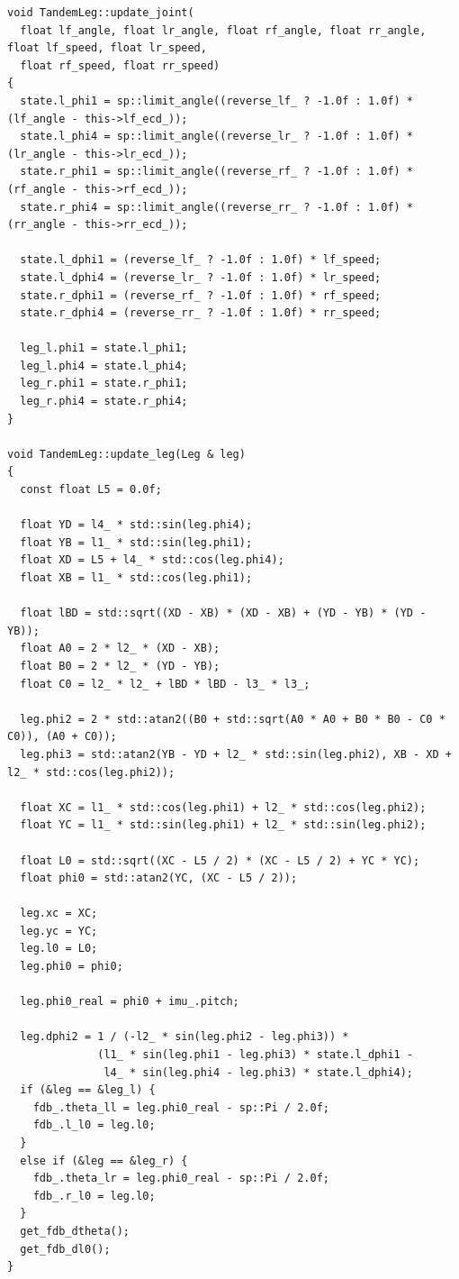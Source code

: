 \begin{verbatim}
void TandemLeg::update_joint(
  float lf_angle, float lr_angle, float rf_angle, float rr_angle, float lf_speed, float lr_speed,
  float rf_speed, float rr_speed)
{
  state.l_phi1 = sp::limit_angle((reverse_lf_ ? -1.0f : 1.0f) * (lf_angle - this->lf_ecd_));
  state.l_phi4 = sp::limit_angle((reverse_lr_ ? -1.0f : 1.0f) * (lr_angle - this->lr_ecd_));
  state.r_phi1 = sp::limit_angle((reverse_rf_ ? -1.0f : 1.0f) * (rf_angle - this->rf_ecd_));
  state.r_phi4 = sp::limit_angle((reverse_rr_ ? -1.0f : 1.0f) * (rr_angle - this->rr_ecd_));

  state.l_dphi1 = (reverse_lf_ ? -1.0f : 1.0f) * lf_speed;
  state.l_dphi4 = (reverse_lr_ ? -1.0f : 1.0f) * lr_speed;
  state.r_dphi1 = (reverse_rf_ ? -1.0f : 1.0f) * rf_speed;
  state.r_dphi4 = (reverse_rr_ ? -1.0f : 1.0f) * rr_speed;

  leg_l.phi1 = state.l_phi1;
  leg_l.phi4 = state.l_phi4;
  leg_r.phi1 = state.r_phi1;
  leg_r.phi4 = state.r_phi4;
}

void TandemLeg::update_leg(Leg & leg)
{
  const float L5 = 0.0f;

  float YD = l4_ * std::sin(leg.phi4);
  float YB = l1_ * std::sin(leg.phi1);
  float XD = L5 + l4_ * std::cos(leg.phi4);
  float XB = l1_ * std::cos(leg.phi1);

  float lBD = std::sqrt((XD - XB) * (XD - XB) + (YD - YB) * (YD - YB));
  float A0 = 2 * l2_ * (XD - XB);
  float B0 = 2 * l2_ * (YD - YB);
  float C0 = l2_ * l2_ + lBD * lBD - l3_ * l3_;

  leg.phi2 = 2 * std::atan2((B0 + std::sqrt(A0 * A0 + B0 * B0 - C0 * C0)), (A0 + C0));
  leg.phi3 = std::atan2(YB - YD + l2_ * std::sin(leg.phi2), XB - XD + l2_ * std::cos(leg.phi2));

  float XC = l1_ * std::cos(leg.phi1) + l2_ * std::cos(leg.phi2);
  float YC = l1_ * std::sin(leg.phi1) + l2_ * std::sin(leg.phi2);

  float L0 = std::sqrt((XC - L5 / 2) * (XC - L5 / 2) + YC * YC);
  float phi0 = std::atan2(YC, (XC - L5 / 2));

  leg.xc = XC;
  leg.yc = YC;
  leg.l0 = L0;
  leg.phi0 = phi0;

  leg.phi0_real = phi0 + imu_.pitch;

  leg.dphi2 = 1 / (-l2_ * sin(leg.phi2 - leg.phi3)) *
              (l1_ * sin(leg.phi1 - leg.phi3) * state.l_dphi1 -
               l4_ * sin(leg.phi4 - leg.phi3) * state.l_dphi4);
  if (&leg == &leg_l) {
    fdb_.theta_ll = leg.phi0_real - sp::Pi / 2.0f;
    fdb_.l_l0 = leg.l0;
  }
  else if (&leg == &leg_r) {
    fdb_.theta_lr = leg.phi0_real - sp::Pi / 2.0f;
    fdb_.r_l0 = leg.l0;
  }
  get_fdb_dtheta();
  get_fdb_dl0();
}


\end{verbatim}
